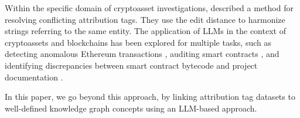 Within the specific domain of cryptoasset investigations, \cite{Gomez2022} described a method for resolving conflicting attribution tags. They use the edit distance to harmonize strings referring to the same entity. The application of LLMs in the context of cryptoassets and blockchains has been explored for multiple tasks, such as detecting anomalous Ethereum transactions \cite{gai_blockchain_2023}, auditing smart contracts \cite{david_you_2023}, and identifying discrepancies between smart contract bytecode and project documentation \cite{gan_defialigner_2024}.

In this paper, we go beyond this approach, by linking attribution tag datasets to well-defined knowledge graph concepts using an LLM-based approach. 
